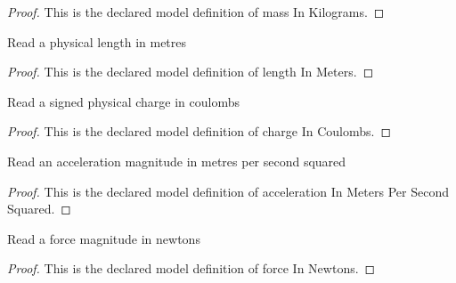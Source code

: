 \begin{proof}
  This is the declared model definition of mass In Kilograms.
\end{proof}
\begin{definition}
  \label{def:physics:phyx-mini-0901:phyxminiproblems-problemphyxmini0901-lengthinmeters}
  Read a physical length in metres
\end{definition}
\begin{proof}
  This is the declared model definition of length In Meters.
\end{proof}
\begin{definition}
  \label{def:physics:phyx-mini-0901:phyxminiproblems-problemphyxmini0901-chargeincoulombs}
  Read a signed physical charge in coulombs
\end{definition}
\begin{proof}
  This is the declared model definition of charge In Coulombs.
\end{proof}
\begin{definition}
  \label{def:physics:phyx-mini-0901:phyxminiproblems-problemphyxmini0901-accelerationinmeterspersecondsquared}
  Read an acceleration magnitude in metres per second squared
\end{definition}
\begin{proof}
  This is the declared model definition of acceleration In Meters Per Second Squared.
\end{proof}
\begin{definition}
  \label{def:physics:phyx-mini-0901:phyxminiproblems-problemphyxmini0901-forceinnewtons}
  Read a force magnitude in newtons
\end{definition}
\begin{proof}
  This is the declared model definition of force In Newtons.
\end{proof}
